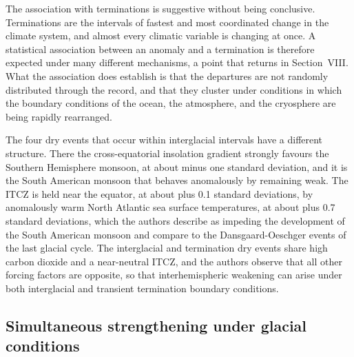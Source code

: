 \documentclass[11pt]{article}
\theoremstyle{definition}
\begin{document}
The association with terminations is suggestive without being conclusive. Terminations are the intervals of fastest and most coordinated change in the climate system, and almost every climatic variable is changing at once. A statistical association between an anomaly and a termination is therefore expected under many different mechanisms, a point that returns in Section~VIII. What the association does establish is that the departures are not randomly distributed through the record, and that they cluster under conditions in which the boundary conditions of the ocean, the atmosphere, and the cryosphere are being rapidly rearranged.

The four dry events that occur within interglacial intervals have a different structure. There the cross-equatorial insolation gradient strongly favours the Southern Hemisphere monsoon, at about minus one standard deviation, and it is the South American monsoon that behaves anomalously by remaining weak. The ITCZ is held near the equator, at about plus 0.1 standard deviations, by anomalously warm North Atlantic sea surface temperatures, at about plus 0.7 standard deviations, which the authors describe as impeding the development of the South American monsoon and compare to the Dansgaard-Oeschger events of the last glacial cycle. The interglacial and termination dry events share high carbon dioxide and a near-neutral ITCZ, and the authors observe that all other forcing factors are opposite, so that interhemispheric weakening can arise under both interglacial and transient termination boundary conditions.

\subsection{Simultaneous strengthening under glacial conditions}
\end{document}
